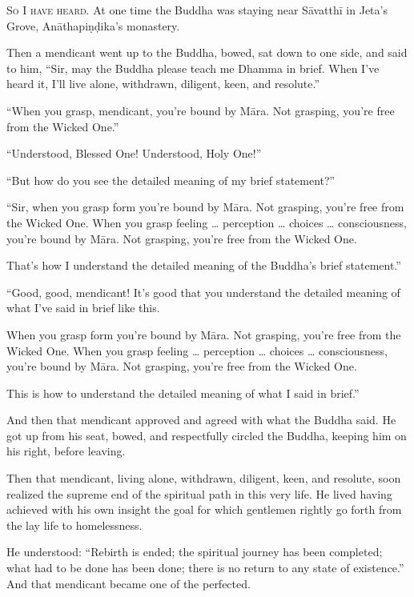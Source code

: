\documentclass[12pt,openany]{book}%
\newcommand*{\scevam}[1]{\textsc{#1}}
\begin{document}
\scevam{So I have heard. }At one time the Buddha was staying near \textsanskrit{Sāvatthī} in Jeta’s Grove, \textsanskrit{Anāthapiṇḍika}’s monastery. 

Then a mendicant went up to the Buddha, bowed, sat down to one side, and said to him, “Sir, may the Buddha please teach me Dhamma in brief. When I’ve heard it, I’ll live alone, withdrawn, diligent, keen, and resolute.” 

“When you grasp, mendicant, you’re bound by \textsanskrit{Māra}. Not grasping, you’re free from the Wicked One.” 

“Understood, Blessed One! Understood, Holy One!” 

“But how do you see the detailed meaning of my brief statement?” 

“Sir, when you grasp form you’re bound by \textsanskrit{Māra}. Not grasping, you’re free from the Wicked One. When you grasp feeling … perception … choices … consciousness, you’re bound by \textsanskrit{Māra}. Not grasping, you’re free from the Wicked One. 

That’s how I understand the detailed meaning of the Buddha’s brief statement.” 

“Good, good, mendicant! It’s good that you understand the detailed meaning of what I’ve said in brief like this. 

When you grasp form you’re bound by \textsanskrit{Māra}. Not grasping, you’re free from the Wicked One. When you grasp feeling … perception … choices … consciousness, you’re bound by \textsanskrit{Māra}. Not grasping, you’re free from the Wicked One. 

This is how to understand the detailed meaning of what I said in brief.” 

And then that mendicant approved and agreed with what the Buddha said. He got up from his seat, bowed, and respectfully circled the Buddha, keeping him on his right, before leaving. 

Then that mendicant, living alone, withdrawn, diligent, keen, and resolute, soon realized the supreme end of the spiritual path in this very life. He lived having achieved with his own insight the goal for which gentlemen rightly go forth from the lay life to homelessness. 

He understood: “Rebirth is ended; the spiritual journey has been completed; what had to be done has been done; there is no return to any state of existence.” And that mendicant became one of the perfected. 
\end{document}
